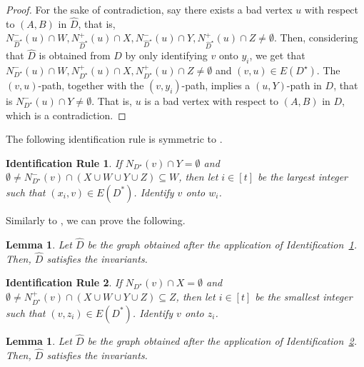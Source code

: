\documentclass[a4paper,11pt]{article}
\theoremstyle{plain}
\newtheorem{lemma}[theorem]{Lemma}
\newtheorem{identification rule}{Identification Rule}
\theoremstyle{definition}
\theoremstyle{remark}
\begin{document}
\begin{proof}
 For the sake of contradiction, say there exists a bad vertex $u$ with respect to $(A,B)$ in $\widehat{D}$, that is, $N_{\widehat{D}^{\star}}^-(u) \cap W, N_{\widehat{D}^{\star}}^+(u) \cap X, N_{\widehat{D}^{\star}}^-(u) \cap Y, N_{\widehat{D}^{\star}}^+(u) \cap Z \neq \emptyset$. 
Then, considering that $\widehat{D}$ is obtained from $D$ by only identifying $v$ onto $y_i$, we get that
$N_{D^{\star}}^-(u) \cap W, N_{D^{\star}}^+(u) \cap X, N_{D^{\star}}^+(u) \cap Z \neq \emptyset$ and $(v,u) \in E(D^{\star})$.  The $(v,u)$-path, together with the $(v,y_i)$-path, implies a $(u,Y)$-path in $D$, that is $N_{D^{\star}}^-(u) \cap Y \neq \emptyset$. That is, $u$ is a bad vertex with respect to $(A,B)$ in $D$, which is a contradiction.
\end{proof}

The following identification rule is symmetric to .

\begin{identification rule}\label{ir:emptyB}
If $N_{D^{\star}}(v) \cap Y=\emptyset$ and $\emptyset \neq N_{D^{\star}}^-(v) \cap (X \cup W \cup Y \cup Z) \subseteq W$, then 
let $i \in [t]$ be the largest integer such that $(x_{i},v) \in E(D^*)$.
Identify $v$ onto $w_{i}$.
\end{identification rule}

Similarly to , we can prove the following.

\begin{lemma}\label{lem:iremptyB-safe}
Let $\widehat{D}$ be the graph obtained after the application of Identification~\ref{ir:emptyB}. Then, $\widehat{D}$ satisfies the invariants.
\end{lemma}

\begin{identification rule}\label{ir:emptyC}
If $N_{D^{\star}}(v) \cap X=\emptyset$ and $\emptyset \neq N_{D^{\star}}^+(v) \cap (X \cup W \cup Y \cup Z) \subseteq Z$, then 
let $i \in [t]$ be the smallest integer such that $(v,z_i) \in E(D^*)$.
Identify $v$ onto $z_{i}$.
\end{identification rule}

\begin{lemma}\label{lem:iremptyC-safe}
Let $\widehat{D}$ be the graph obtained after the application of Identification~\ref{ir:emptyC}. Then, $\widehat{D}$ satisfies the invariants.
\end{lemma}
\end{document}

